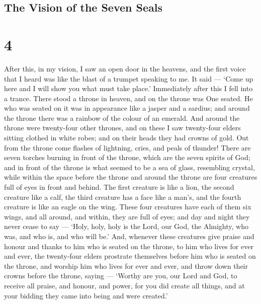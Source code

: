 \hypertarget{the-vision-of-the-seven-seals}{%
\subsection{The Vision of the Seven
Seals}\label{the-vision-of-the-seven-seals}}

\hypertarget{section-3}{%
\section{4}\label{section-3}}

 After this, in my vision, I saw an open door in the
heavens, and the first voice that I heard was like the blast of a
trumpet speaking to me. It said --- `Come up here and I will show you
what must take place.'  Immediately after this I fell into a
trance. There stood a throne in heaven, and on the throne was One
seated.  He who was seated on it was in appearance like a
jasper and a sardius; and around the throne there was a rainbow of the
colour of an emerald.  And around the throne were
twenty-four other thrones, and on these I saw twenty-four elders sitting
clothed in white robes; and on their heads they had crowns of gold.
 Out from the throne come flashes of lightning, cries, and
peals of thunder! There are seven torches burning in front of the
throne, which are the seven spirits of God;  and in front of
the throne is what seemed to be a sea of glass, resembling crystal,
while within the space before the throne and around the throne are four
creatures full of eyes in front and behind.  The first
creature is like a lion, the second creature like a calf, the third
creature has a face like a man's, and the fourth creature is like an
eagle on the wing.  These four creatures have each of them
six wings, and all around, and within, they are full of eyes; and day
and night they never cease to say --- `Holy, holy, holy is the Lord, our
God, the Almighty, who was, and who is, and who will be.' 
And, whenever these creatures give praise and honour and thanks to him
who is seated on the throne, to him who lives for ever and ever,
 the twenty-four elders prostrate themselves before him who
is seated on the throne, and worship him who lives for ever and ever,
and throw down their crowns before the throne, saying --- 
`Worthy are you, our Lord and God, to receive all praise, and honour,
and power, for you did create all things, and at your bidding they came
into being and were created.'

